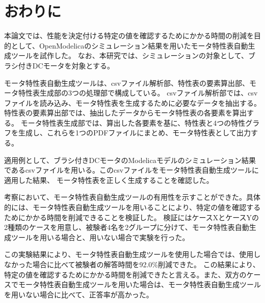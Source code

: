 \chapter{おわりに}\label{cha:Conclusion}
本論文では、性能を決定付ける特定の値を確認するためにかかる時間の削減を目的として、OpenModelicaのシミュレーション結果を用いたモータ特性表自動生成ツールを試作した。
なお、本研究では、シミュレーションの対象として、ブラシ付きDCモータを対象とする。

モータ特性表自動生成ツールは、csvファイル解析部、特性表の要素算出部、モータ特性表生成部の3つの処理部で構成している。
csvファイル解析部では、csvファイルを読み込み、モータ特性表を生成するために必要なデータを抽出する。特性表の要素算出部では、抽出したデータからモータ特性表の各要素を算出する。
モータ特性表生成部では、算出した各要素を基に、特性表と4つの特性グラフを生成し、これらを1つのPDFファイルにまとめ、モータ特性表として出力する。

適用例として、ブラシ付きDCモータのModelicaモデルのシミュレーション結果であるcsvファイルを用いる。このcsvファイルをモータ特性表自動生成ツールに適用した結果、
モータ特性表を正しく生成することを確認した。

考察において、モータ特性表自動生成ツールの有用性を示すことができた。具体的には、モータ特性表自動生成ツールを用いることにより、特定の値を確認するためにかかる時間を削減できることを検証した。
検証にはケースXとケースYの2種類のケースを用意し、被験者4名を2グループに分けて、モータ特性表自動生成ツールを用いる場合と、用いない場合で実験を行った。

この実験結果により、モータ特性表自動生成ツールを使用した場合では、使用しなかった場合に比べて被験者の解答時間を92.0\%削減できた。
この結果により、特定の値を確認するためにかかる時間を削減できたと言える。また、双方のケースでモータ特性表自動生成ツールを用いた場合は、モータ特性表自動生成ツールを用いない場合に比べて、正答率が高かった。

